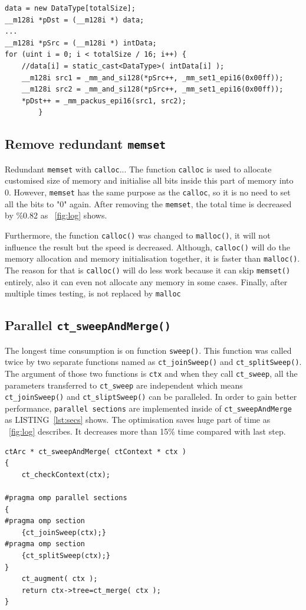 \documentclass[conference]{IEEEtran}
\newcommand{\fref}[1]{\figurename~\ref{#1}}
\newcommand{\lref}[1]{LISTING~\ref{#1}}
\begin{document}
\begin{lstlisting}[caption={Data Load with SIMD Intrinsics},captionpos=b,label=lst:mem]
data = new DataType[totalSize];
__m128i *pDst = (__m128i *) data;
...
__m128i *pSrc = (__m128i *) intData;
for (uint i = 0; i < totalSize / 16; i++) {
    //data[i] = static_cast<DataType>( intData[i] );
    __m128i src1 = _mm_and_si128(*pSrc++, _mm_set1_epi16(0x00ff));
    __m128i src2 = _mm_and_si128(*pSrc++, _mm_set1_epi16(0x00ff));
    *pDst++ = _mm_packus_epi16(src1, src2);
        }
\end{lstlisting}

\subsection{Remove redundant \texttt{memset}}

Redundant \texttt{memset} with \texttt{calloc}...
The function \texttt{calloc} is used to allocate customised size of memory and initialise all bits inside this part of memory into 0. However, \texttt{memset} has the same purpose as the \texttt{calloc}, so it is no need to set all the bits to "0" again. After removing the \texttt{memset}, the total time is decreased by \%0.82 as \fref{fig:log} shows. 

Furthermore, the function \texttt{calloc()} was changed to \texttt{malloc()}, it will not influence the result but the speed is decreased. Although, \texttt{calloc()} will do the memory allocation and memory initialisation together, it is faster than \texttt{malloc()}. The reason for that is \texttt{calloc()} will do less work because it can skip \texttt{memset()} entirely, also it can even not allocate any memory in some cases. Finally, after multiple times testing, \cite{calloc} is not replaced by \texttt{malloc}

\subsection{Parallel \texttt{ct\_sweepAndMerge()}}
The longest time consumption is on function \texttt{sweep()}. This function was called twice by two separate functions named as \texttt{ct\_joinSweep()} and \texttt{ct\_splitSweep()}. The argument of those two functions is \texttt{ctx} and when they call \texttt{ct\_sweep}, all the parameters transferred to \texttt{ct\_sweep} are independent which means \texttt{ct\_joinSweep()} and \texttt{ct\_sliptSweep()} can be paralleled. In order to gain better performance, \texttt{parallel sections} are implemented inside of \texttt{ct\_sweepAndMerge} as \lref{lst:secs} shows. The optimisation saves huge part of time as \fref{fig:log} describes. It decreases more than 15\% time compared with last step. 
\begin{lstlisting}[caption={Data Load with SIMD Intrinsics},captionpos=b,label=lst:secs]
ctArc * ct_sweepAndMerge( ctContext * ctx )
{
    ct_checkContext(ctx);
    
#pragma omp parallel sections    
{    
#pragma omp section
    {ct_joinSweep(ctx);}
#pragma omp section
    {ct_splitSweep(ctx);}
}   
    ct_augment( ctx );
    return ctx->tree=ct_merge( ctx );
}
\end{lstlisting}
\end{document}
